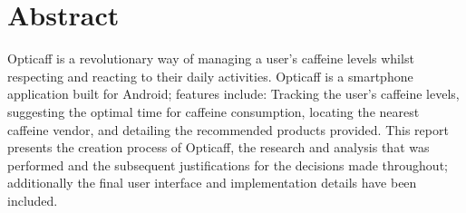 \section*{Abstract}
Opticaff is a revolutionary way of managing a user's caffeine levels whilst respecting and reacting to their daily activities.
Opticaff is a smartphone application built for Android; features include: 
Tracking the user's caffeine levels, 
suggesting the optimal time for caffeine consumption, 
locating the nearest caffeine vendor, 
and detailing the recommended products provided.  
This report presents the creation process of Opticaff, the research and analysis that was performed and the subsequent justifications for the decisions made throughout; additionally the final user interface and implementation details have been included. 

